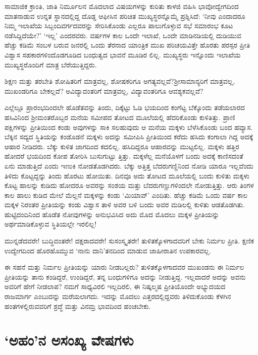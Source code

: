 ಸಾಮಾಜಿಕ ಕ್ರಾಂತಿ, ಜಾತಿ ನಿರ್ಮೂಲನ ಮೊದಲಾದ ವಿಷಯಗಳನ್ನು ಕುರಿತು ಕಾಳಜಿ ವಹಿಸಿ ಭಾವೋದ್ವೇಗದಿಂದ ಮಾತನಾಡುವ ಉನ್ನತ ಸ್ಥಾನದಲ್ಲಿದ್ದ ದೊಡ್ಡ ಆಫೀಸಿನ ಪರಿಚಿತ ಮುಖ್ಯಸ್ಥರನ್ನೊಮ್ಮೆ ಪ್ರಶ್ನಿಸಿದೆ: ‘ನೀವು ಎಂದಾದರೂ ನಿಮ್ಮ ಇಲಾಖೆಯ ಸಿಬ್ಬಂದಿವರ್ಗದವರನ್ನು ಸೇರಿಸಿಕೊಂಡು ಎಲ್ಲರೂ ಪಾಲುಗೊಳ್ಳುವ ಸಭೆ ಸಮಾರಂಭ ಕೂಟ ನಡೆಸಿದ್ದಿದೆಯೇ?’ ‘ಇಲ್ಲ’ ಎಂದರವರು. ವರ್ಷಗಳ ಕಾಲ ಒಂದೇ ಇಲಾಖೆ, ಒಂದೇ ಮಾಡಿನಡಿಯಲ್ಲಿ ದುಡಿಯುವ ಹೆಚ್ಚು ಕಡಿಮೆ ಸಂಬಳ ಬರುವ ಜನರಲ್ಲಿ ಒಂದು ತೆರನಾದ ಯಾಂತ್ರಿಕ ಮುಖ ಪರಿಚಯವಿತ್ತೇ ಹೊರತು ಪರಸ್ಪರ ಪ್ರೀತಿ ವಿಶ್ವಾಸ ಸಹಕಾರಗಳಿಂದೊಡಗೂಡಿದ ಬಂಧುತ್ವದ ಭಾವನೆ ಮೂಡಿರ ಲಿಲ್ಲ. ಮುಖ್ಯಸ್ಥರು ಇನ್ನೊಂದು ಇಲಾಖೆಯ ಮುಖ್ಯಸ್ಥರೊಂದಿಗೆ ಮಾತ್ರ ಬೆರೆಯುತ್ತಿದ್ದರು.

ಶಿಕ್ಷಣ ಮತ್ತು ತರಬೇತಿ ಶೋಷಿತರಿಗೆ ಮಾತ್ರವಲ್ಲ, ಶೋಷಕರಿಗೂ ಅಗತ್ಯವಲ್ಲವೆ?\break ಶ‍್ರೀಸಾಮಾನ್ಯರಿಗೆ ಮಾತ್ರವಲ್ಲ, ಮುಖಂಡರಿಗೂ ಬೇಕಲ್ಲವೆ? ಅವಿದ್ಯಾವಂತರಿಗೆ ಮಾತ್ರವಲ್ಲ, ವಿದ್ಯಾವಂತರಿಗೂ ಆವಶ್ಯಕವಲ್ಲವೆ?

ಎಲ್ಲೆಲ್ಲೂ ಪ್ರಾರಂಭದಿಂದಲೇ ಹೊಡೆತವನ್ನು ತಿಂದು, ದಿಕ್ಕೆಟ್ಟು ಓಡಿ ಭಯದಿಂದ ಕಂಗೆಟ್ಟ ಬೆಕ್ಕೊಂದು ತಡೆಯಲಾರದ ಹಸಿವಿನಿಂದ ಶ‍್ರೀಮಂತರೊಬ್ಬರ ಮನೆಯ ಸಮೀಪದ ತೋಟದ ಮೂಲೆಯಲ್ಲಿ ಹೆದರಿಕೊಂಡು ಕುಳಿತಿತ್ತು. ಪ್ರಾಣಿ ಪಕ್ಷಿಗಳನ್ನು ಪ್ರೀತಿಯಿಂದ ಕಂಡು ಅವುಗಳನ್ನು ಸಾಕಿ ಸಲಹುವುದು ಆ ಮನೆಯ ಮಕ್ಕಳು ಬೆಳೆಸಿಕೊಂಡು ಬಂದ ಹವ್ಯಾಸ. ಬೆಕ್ಕಿನ ಸದ್ಯದ ಸ್ಥಿತಿಯನ್ನು ಕಂಡೊಡನೆ ಮಕ್ಕಳು ಅದನ್ನು ಸಮೀಪಿಸಿ ಪ್ರೀತಿಯಿಂದ ಕರೆದು ಹಸಿದು ಕಂಗಾಲಾ ಗಿದ್ದ ಅದಕ್ಕೆ ಆಹಾರ ನೀಡಿದರು. ಬೆಕ್ಕು ಕುಳಿತ ಜಾಗದಿಂದ ಕದಲಿಲ್ಲ. ಹಸಿದಿದ್ದರೂ ಆಹಾರವನ್ನು ಮುಟ್ಟಲಿಲ್ಲ. ಮಕ್ಕಳು ಹತ್ತಿರ ಹೋದರೆ ಭಯದಿಂದ ಕೋಪ ತೋರಿಸಿ ಬುಸುಗುಟ್ಟು ತ್ತಿತ್ತು. ಮಕ್ಕಳೆಲ್ಲ ಮನೆಯೊಳಗೆ ಬಂದು ಅದಕ್ಕೆ ಕಾಣಿಸದಂತೆ ಏನು ಮಾಡುತ್ತಿದೆ ಎಂದು ಇಣುಕಿ ನೋಡತೊಡಗಿದರು. ಬೆಕ್ಕು ಅತ್ತಿತ್ತ ಬೆದರುಗಣ್ಣಿನಿಂದ ನೋಡಿ ಯಾರೂ ಇಲ್ಲವೆಂದು ತಿಳಿದು ಕೊಟ್ಟದ್ದನ್ನು ತಿಂದು ಹೊರಟು ಹೋಯಿತು. ದಿನವೂ ಅದು ತೋಟದ ಮೂಲೆಯಲ್ಲಿ ಬಂದು ಕುಳಿತು ಮಕ್ಕಳು ಕೊಟ್ಟ ಹಾಲನ್ನು ಕುಡಿದು ಹೋದರೂ ಅವರನ್ನು ಸಂಶಯ ಮತ್ತು ಬೆದರುಗಣ್ಣುಗಳಿಂದಲೇ ನೋಡುತ್ತಿತ್ತು. ಆರು ತಿಂಗಳ ಕಾಲ ಹಾಲು ಕುಡಿದ ಮೇಲೆ ಮೆಲ್ಲನೆ ಮಕ್ಕಳನ್ನು ಕಂಡು ‘ಮಿಯಾವ್​’ ಎಂದಿತು. ಹೆಚ್ಚು ಕಡಿಮೆ ಒಂದು ವರ್ಷ ಕಾಲ ಮಕ್ಕಳ ನಿರಂತರ ಪ್ರೀತಿಯನ್ನು ಕಂಡು ವಿಶ್ವಾಸ ತಾಳಿ ಅವರ ಬಳಿ ಬಂದು ಅವರ ಮಡಿಲಲ್ಲಿ ಕುಳಿತು ಆಡತೊಡಗಿತು. ಹುಟ್ಟಿದಂದಿನಿಂದ ಹೊಡೆತ ನೋವುಗಳನ್ನು ಅನುಭವಿಸಿದ ಅದು ಮೊದ ಮೊದಲು ಮಕ್ಕಳ ಪ್ರೀತಿಯನ್ನು ಅರ್ಥಮಾಡಿಕೊಳ್ಳುವ ಸ್ಥಿತಿಯಲ್ಲೇ ಇರಲಿಲ್ಲ!

ಮುನ್ನಡೆದವರೇ! ಬುದ್ಧಿವಂತರೇ! ದಕ್ಷರಾದವರೇ! ಸುಸಂಸ್ಕೃತರೇ! ತುಳಿತಕ್ಕೊಳಗಾದವರಿಗೆ ಬೇಕು ನಿರ್ಮಲ ಪ್ರೀತಿ. ಕ್ಷಣಿಕ ಉದ್ವೇಗದಿಂದ ಹೊರಹೊಮ್ಮುವ ‘ನಾನು ದಾನಿ’ತನದಿಂದ ಮಾಡುವ ಜಾಹೀರಾತಿನ ಉಪಕಾರವಲ್ಲ.

ಈ ಸಹನೆ ಮತ್ತು ನಿರ್ಮಲ ಪ್ರೀತಿಯನ್ನು ಯಾರು ನೀಡಬಲ್ಲರು? ತುಳಿತಕ್ಕೊಳಗಾದವರ ಮುಖಂಡನು ಈ ನಿರ್ಮಲ ಪ್ರೀತಿಯನ್ನು ತಾನು ಕಂಡಿದ್ದರೆ, ಉಂಡಿದ್ದರೆ, ತನ್ನ ಬಂಧುಗಳಿಗೂ ಅದನ್ನು ನೀಡುತ್ತಿದ್ದ. ಇಲ್ಲವಾದರೆ ಅದನ್ನು ಅವನು ಅವರಿಗೆ ಹೇಗೆ ನೀಡಲಾಪ? ನಮಗೆ ಸಾಧ್ಯವಿರಲಿ ಇಲ್ಲದಿರಲಿ, ಈ ನಿಷ್ಕಲ್ಮಷ ಪ್ರೀತಿಯೊಂದೇ ಅಭ್ಯುದಯದ ರಾಜಮಾರ್ಗ ಎಂಬುದನ್ನು ಮರೆಯಲಾಗದು. ಇದನ್ನು ಮೊದಲು ಎತ್ತರದಲ್ಲಿದ್ದವರು ತಿಳಿದುಕೊಂಡು ಕೆಳಗಿನ ಹಂತಗಳಲ್ಲಿರು\-ವವರಿಗೆ ಶ್ರದ್ಧೆ ಮತ್ತು ವಿನಮ್ರ ಭಾವದಿಂದ ಹಂಚಬೇಕು.


\section*{‘ಅಹಂ’ನ ಅಸಂಖ್ಯ ವೇಷಗಳು}

